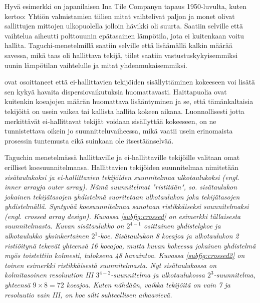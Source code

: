 \documentclass[12pt,a4paper,finnish]{tutthesis}
\begin{document}
Hyvä esimerkki on japanilaisen Ina Tile Companyn tapaus 1950-luvulta,
kuten \textcite{Kackar1989} kertoo:
Yhtiön valmistamien tiilien mitat vaihtelivat paljon ja monet olivat sallittujen mittojen ulkopuolella
jolloin hävikki oli suurta.
Saatiin selville että vaihtelua aiheutti polttouunin epätasainen lämpötila,
jota ei kuitenkaan voitu hallita. Taguchi-menetelmillä saatiin selville että
lisäämällä kalkin määrää savessa, mikä taas oli hallittava tekijä, tiilet saatiin
vastustuskykyisemmiksi uunin lämpötilan vaihtelulle ja mitat yhdenmukaisemmiksi.

\textcite{steinberg1994,Steinberg1998,Berube1998} ovat osoittaneet
että ei-hallittavien tekijöiden sisällyttäminen kokeeseen voi
lisätä sen kykyä havaita dispersiovaikutuksia huomattavasti.
Haittapuolia ovat kuitenkin koeajojen määrän huomattava lisääntyminen
ja se, että tämänkaltaisia tekijöitä on usein vaikea
tai kallista hallita kokeen aikana. Luonnollisesti jotta merkittävät ei-hallittavat
tekijät voidaan sisällyttää kokeeseen, on ne tunnistettava oikein jo
suunnitteluvaiheessa, mikä vaatii usein erinomaista prosessin tuntemusta
eikä suinkaan ole itsestäänselvää.

Taguchin menetelmässä hallittaville ja ei-hallittaville
tekijöille valitaan omat erilliset koesuunnitelmansa.
Hallittavien tekijöiden suunnitelmaa nimitetään \em sisätaulukoksi \em
ja ei-hallittavien tekijöiden suunnitelmaa \em ulkotaulukoksi \em
(engl. \em inner array\em ja \em outer array\em).
Nämä suunnitelmat
"ristitään", so. sisätaulukon jokainen tekijätasojen yhdistelmä
suoritetaan ulkotaulukon joka tekijätasojen yhdistelmällä. Syntyvää
koesuunnitelmaa sanotaan \em ristikkäiseksi suunnitelmaksi \em
(engl. crossed array design). Kuvassa \ref{subfig:crossed} on esimerkki tällaisesta suunnitelmasta.
Kuvan sisätaulukko on \(2^{4-1}\) osittainen yhdistelykoe ja ulkotaulukko
yksinkertainen \(2^1\)-koe. Sisätaulukon 8 koeajoa ja ulkotaulukon 2
ristiöitynä tekevät yhteensä 16 koeajoa, mutta kuvan kokeessa jokainen
yhdistelmä myös toistettiin kolmesti, tuloksena 48 havaintoa.
Kuvassa \ref{subfig:crossed2}
on toinen esimerkki ristikkäisestä suunnitelmasta. Nyt sisätaulukossa
on kolmitasoinen resoluution III \(3^{4-2}\)-suunnitelma ja ulkotaulukossa \(2^3\)-suunnitelma,
yhteensä \(9\times 8=72\) koeajoa. Kuten nähdään, vaikka tekijöitä on vain
7 ja resoluutio vain III, on koe silti suhteellisen aikaavievä.
\end{document}
